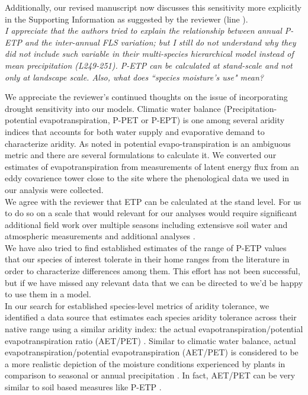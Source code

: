 \documentclass{article}[11pt]
\begin{document}
Additionally, our revised manuscript now discusses this sensitivity more explicitly in the Supporting Information as suggested by the reviewer (line ).\\


\textit{I appreciate that the authors tried to explain the relationship between annual P-ETP and the inter-annual FLS variation; but I still do not understand why they did not include such variable in their multi-species hierarchical model instead of mean precipitation (L249-251). P-ETP can be calculated at stand-scale and not only at landscape scale. Also, what does ``species moisture's use" mean?}

We appreciate the reviewer's continued thoughts on the issue of incorporating drought sensitivity into our models. Climatic water balance (Precipitation-potential evapotranspiration, P-PET or P-EPT) is one among several aridity indices that accounts for both water supply and evaporative demand to characterize aridity. As noted in \citet{Speich:2019aa} potential evapo-transpiration is an ambiguous metric and there are several formulations to calculate it. We converted our estimates of evapotranspiration from measurements of latent energy flux \citep{Knauer2018} from an eddy covarience tower close to the site where the phenological data we used in our analysis were collected.\\

We agree with the reviewer that ETP can be calculated at the stand level. For us to do so on a scale that would relevant for our analyses would require significant additional field work over multiple seasons including extensisve soil water and atmospheric measurements and additional analyses \citep{GARNIER:1952aa,Allan:1998aa}.\\ 

We have also tried to find established estimates of the range of P-ETP values that our species of interest tolerate in their home ranges from the literature in order to characterize differences among them. This effort has not been successful, but if we have missed any relevant data that we can be directed to we'd be happy to use them in a model.\\ 

In our search for established species-level metrics of aridity tolerance, we identified a data source that estimates each species aridity tolerance across their native range using a similar aridity index: the actual evapotranspiration/potential evapotranspiration ratio (AET/PET) \citep{Thomspson2012}. Similar to climatic water balance, actual evapotranspiration/potential evapotranspiration (AET/PET) is considered to be a more realistic depiction of the moisture conditions experienced by plants in comparison to seasonal or annual precipitation \citep{Thomspson2012}. In fact, AET/PET can be very similar to soil based measures like  P-ETP \citep{Speich:2019aa}.\\
\end{document}
